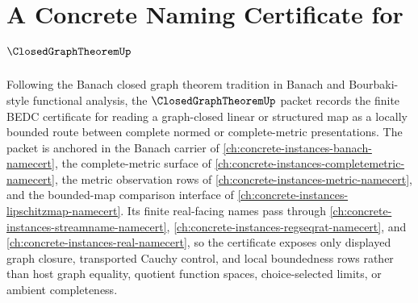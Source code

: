\chapter{A Concrete Naming Certificate for $\ClosedGraphTheoremUp$}
\label{ch:concrete-instances-closed-graph-theorem-namecert}

Following the Banach closed graph theorem tradition in Banach and Bourbaki-style functional analysis, the $\ClosedGraphTheoremUp$ packet records the finite BEDC certificate for reading a graph-closed linear or structured map as a locally bounded route between complete normed or complete-metric presentations. The packet is anchored in the Banach carrier of \autoref{ch:concrete-instances-banach-namecert}, the complete-metric surface of \autoref{ch:concrete-instances-completemetric-namecert}, the metric observation rows of \autoref{ch:concrete-instances-metric-namecert}, and the bounded-map comparison interface of \autoref{ch:concrete-instances-lipschitzmap-namecert}. Its finite real-facing names pass through \autoref{ch:concrete-instances-streamname-namecert}, \autoref{ch:concrete-instances-regseqrat-namecert}, and \autoref{ch:concrete-instances-real-namecert}, so the certificate exposes only displayed graph closure, transported Cauchy control, and local boundedness rows rather than host graph equality, quotient function spaces, choice-selected limits, or ambient completeness.

